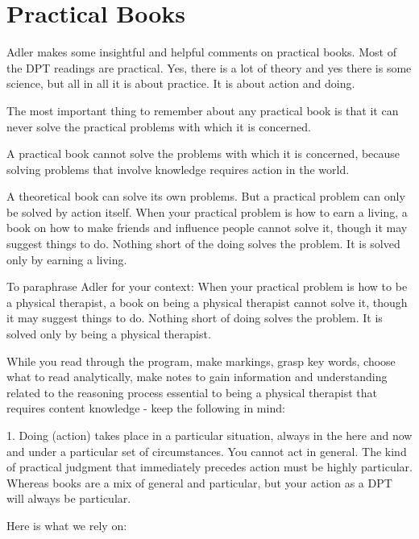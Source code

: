 \section{Practical Books}

Adler makes some insightful and helpful comments on practical books. Most of the DPT readings are practical. Yes, there is a lot of theory and yes there is some science, but all in all it is about practice. It is about action and doing. 

\begin{displayquote}
The most important thing to remember about any practical book is that it can never solve the practical problems with which it is concerned.
\end{displayquote}

A practical book cannot solve the problems with which it is concerned, because solving problems that involve knowledge requires action in the world. 

\begin{displayquote}
A theoretical book can solve its own problems. But a practical problem can only be solved by action itself. When your practical problem is how to earn a living, a book on how to make friends and influence people cannot solve it, though it may suggest things to do. Nothing short of the doing solves the problem. It is solved only by earning a living.
\end{displayquote}

To paraphrase Adler for your context: When your practical problem is how to be a physical therapist, a book on being a physical therapist cannot solve it, though it may suggest things to do. Nothing short of doing solves the problem. It is solved only by being a physical therapist.

While you read through the program, make markings, grasp key words, choose what to read analytically, make notes to gain information and understanding related to the reasoning process essential to being a physical therapist that requires content knowledge - keep the following in mind: 

1. Doing (action) takes place in a particular situation, always in the here and now and under a particular set of circumstances. You cannot act in general. The kind of practical judgment that immediately precedes action must be highly particular. Whereas books are a mix of general and particular, but your action as a DPT will always be particular. 

Here is what we rely on:


